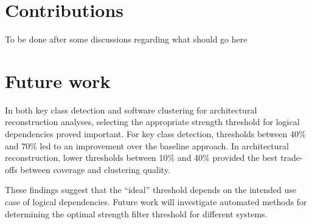 \section{Contributions}

To be done after some discussions regarding what should go here

\section{Future work}

\hspace{4em}In both key class detection and software clustering for architectural reconstruction analyses, selecting the appropriate strength threshold for logical dependencies proved important. For key class detection, thresholds between 40\% and 70\% led to an improvement over the baseline approach. In architectural reconstruction, lower thresholds between 10\% and 40\% provided the best trade-offs between coverage and clustering quality. 

These findings suggest that the “ideal” threshold depends on the intended use case of logical dependencies. Future work will investigate automated methods for determining the optimal strength filter threshold for different systems.
